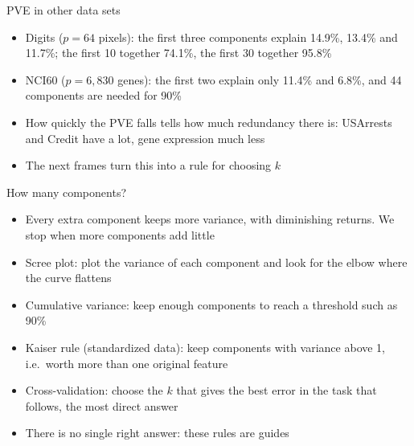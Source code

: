 \begin{frame}{PVE in other data sets}
    \begin{itemize}
        \item Digits ($p = 64$ pixels): the first three components explain 14.9\%, 13.4\% and 11.7\%; the first 10 together 74.1\%, the first 30 together 95.8\%
        \item NCI60 ($p = 6{,}830$ genes): the first two explain only 11.4\% and 6.8\%, and 44 components are needed for 90\%
        \item How quickly the PVE falls tells how much redundancy there is: USArrests and Credit have a lot, gene expression much less
        \item The next frames turn this into a rule for choosing $k$
    \end{itemize}
\end{frame}

\begin{frame}{How many components?}
    \begin{itemize}
        \item Every extra component keeps more variance, with diminishing returns. We stop when more components add little
        \item Scree plot: plot the variance of each component and look for the elbow where the curve flattens
        \item Cumulative variance: keep enough components to reach a threshold such as 90\%
        \item Kaiser rule (standardized data): keep components with variance above 1, i.e.\ worth more than one original feature
        \item Cross-validation: choose the $k$ that gives the best error in the task that follows, the most direct answer
        \item There is no single right answer: these rules are guides
    \end{itemize}
\end{frame}

